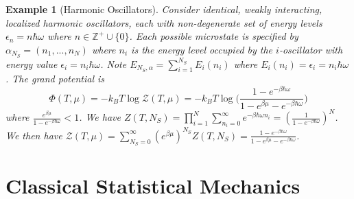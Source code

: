 \documentclass[a4paper]{article}
\newtheorem{eg}{Example}[section]
\theoremstyle{new}
\begin{document}
\begin{eg}[Harmonic Oscillators]
Consider identical, weakly interacting, localized harmonic oscillators, each with non-degenerate set of energy levels $\epsilon_n=n\hbar\omega$ where $n\in\mathbb{Z}^+\cup\{0\}$. Each possible microstate is specified by $\alpha_{N_S}=(n_1,...,n_N)$ where $n_i$ is the energy level occupied by the $i$-oscillator with energy value $\epsilon_i=n_i\hbar\omega$. Note $E_{N_S,\alpha}=\sum_{i=1}^{N_S}E_i(n_i)$ where $E_i(n_i)=\epsilon_i=n_i\hbar\omega$. The grand potential is
$$\Phi(T,\mu)=-k_BT\log\mathcal{Z}(T,\mu)=-k_BT\log\bigg(\frac{1-e^{-\beta\hbar\omega}}{1-e^{\beta\mu}-e^{-\beta\hbar\omega}}\bigg)$$
where $\frac{e^{\beta\mu}}{1-e^{-\beta\hbar\omega}}<1$. We have $Z(T,N_S)=\prod_{i=1}^N\sum_{n_i=0}^\infty e^{-\beta\hbar\omega n_i}=(\frac{1}{1-e^{-\beta\hbar\omega}})^N$. We then have $\mathcal{Z}(T,\mu)=\sum_{N_S=0}^\infty (e^{\beta\mu})^{N_S}Z(T,N_S)=\frac{1-e^{-\beta\hbar\omega}}{1-e^{\beta\mu}-e^{-\beta\hbar\omega}}$.
\end{eg}
\newpage
\section{Classical Statistical Mechanics}
\end{document}
